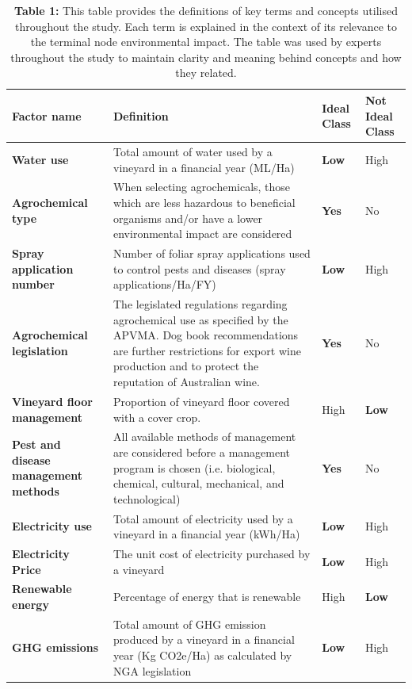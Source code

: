 \begin{table}[h]\label{tab:definitions} 
    \begin{tabular}{@{}llll@{}}
        \caption{\textbf{Table 1:} This table provides the definitions of key terms and concepts utilised throughout the study. Each term is explained in the context of its relevance to the terminal node environmental impact. The table was used by experts throughout the study to maintain clarity and meaning behind concepts and how they related.}
    \toprule
    \textbf{Factor name} & Definition & \textbf{Ideal Class} & Not Ideal Class \\ \midrule
    \textbf{Water use} & Total amount of water used by a vineyard in a financial year (ML/Ha) & \textbf{Low} & High \\
    \textbf{Agrochemical type} & When selecting agrochemicals, those which are less hazardous to beneficial organisms and/or have a lower environmental impact are considered & \textbf{Yes} & No \\
    \textbf{Spray application number} & Number of foliar spray applications used to control pests and diseases (spray applications/Ha/FY) & \textbf{Low} & High \\
    \textbf{Agrochemical legislation} & The legislated regulations regarding agrochemical use as specified by the APVMA. Dog book recommendations are further restrictions for export wine production and to protect the reputation of Australian wine. & \textbf{Yes} & No \\
    \textbf{Vineyard floor management} & Proportion of vineyard floor covered with a cover crop. & High & \textbf{Low} \\
    \textbf{Pest and disease management methods} & All available methods of management are considered before a management program is chosen (i.e. biological, chemical, cultural, mechanical, and technological) & \textbf{Yes} & No \\
    \textbf{Electricity use} & Total amount of electricity used by a vineyard in a financial year (kWh/Ha) & \textbf{Low} & High \\
    \textbf{Electricity Price} & The unit cost of electricity purchased by a vineyard & \textbf{Low} & High \\
    \textbf{Renewable energy} & Percentage of energy that is renewable & High & \textbf{Low} \\
    \textbf{GHG emissions} & Total amount of GHG emission produced by a vineyard in a financial year (Kg CO2e/Ha) as calculated  by NGA legislation & \textbf{Low} & High \\

\end{tabular}
\end{table}
